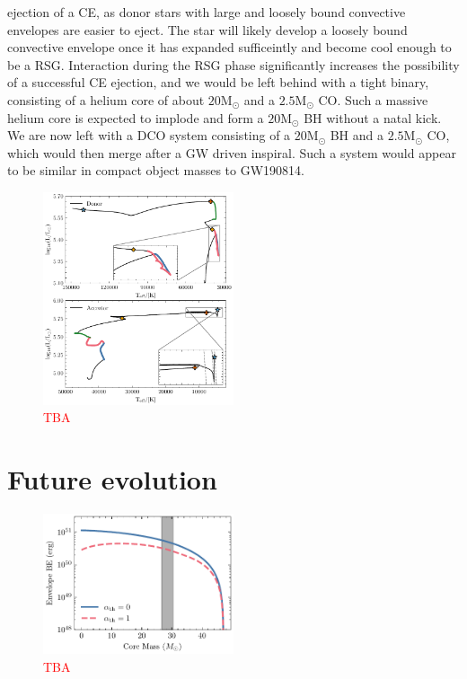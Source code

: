 \documentclass[linenumbers,trackchanges,twocolumn]{aastex701}
\newcommand{\Mdot}{\mathrm{M}_{\odot}}
\newcommand{\red}{\textcolor{red}}
\begin{document}
ejection of a CE, as donor stars with large and loosely bound convective envelopes are easier to eject. The star will likely develop a loosely bound convective envelope once it has expanded sufficeintly and become cool enough to be a RSG. Interaction during the RSG phase significantly increases the possibility of a successful CE ejection, and we would be left behind with a tight binary, consisting of a helium core of about $20\Mdot$ and a $2.5\Mdot$ CO. Such a massive helium core is expected to implode and form a $20\Mdot$ BH without a natal kick. We are now left with a DCO system consisting of a $20\Mdot$ BH and a $2.5\Mdot$ CO, which would then merge after a GW driven inspiral. Such a system would appear to be similar in compact object masses to GW190814. 

\begin{figure}[htbp]
    \centering
    \includegraphics[width=0.5\textwidth]{gw_fiducial_hr.pdf}
    \caption{\red{TBA}}
    \label{fig:gw_hr}
\end{figure}

\section{Future evolution}

\begin{figure}[htbp]
    \centering
    \includegraphics[width=0.5\textwidth]{xrb_be.pdf}
    \caption{\red{TBA}}
    \label{fig:xrb_be}
\end{figure}
\end{document}
